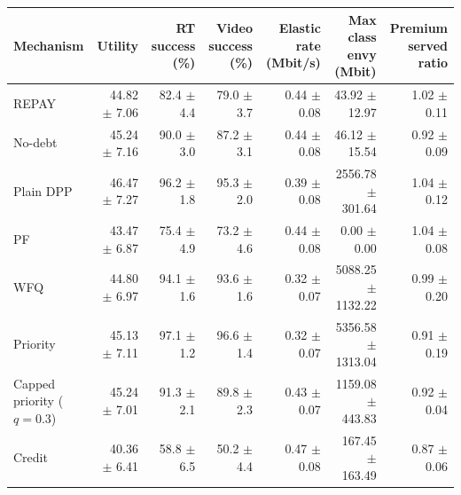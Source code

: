 \begin{tabular}{lrrrrrr}
\toprule
Mechanism & Utility & RT success (\%) & Video success (\%) & Elastic rate (Mbit/s) & Max class envy (Mbit) & Premium served ratio \\
\midrule
REPAY & 44.82 $\pm$ 7.06 & 82.4 $\pm$ 4.4 & 79.0 $\pm$ 3.7 & 0.44 $\pm$ 0.08 & 43.92 $\pm$ 12.97 & 1.02 $\pm$ 0.11 \\
No-debt & 45.24 $\pm$ 7.16 & 90.0 $\pm$ 3.0 & 87.2 $\pm$ 3.1 & 0.44 $\pm$ 0.08 & 46.12 $\pm$ 15.54 & 0.92 $\pm$ 0.09 \\
Plain DPP & 46.47 $\pm$ 7.27 & 96.2 $\pm$ 1.8 & 95.3 $\pm$ 2.0 & 0.39 $\pm$ 0.08 & 2556.78 $\pm$ 301.64 & 1.04 $\pm$ 0.12 \\
PF & 43.47 $\pm$ 6.87 & 75.4 $\pm$ 4.9 & 73.2 $\pm$ 4.6 & 0.44 $\pm$ 0.08 & 0.00 $\pm$ 0.00 & 1.04 $\pm$ 0.08 \\
WFQ & 44.80 $\pm$ 6.97 & 94.1 $\pm$ 1.6 & 93.6 $\pm$ 1.6 & 0.32 $\pm$ 0.07 & 5088.25 $\pm$ 1132.22 & 0.99 $\pm$ 0.20 \\
Priority & 45.13 $\pm$ 7.11 & 97.1 $\pm$ 1.2 & 96.6 $\pm$ 1.4 & 0.32 $\pm$ 0.07 & 5356.58 $\pm$ 1313.04 & 0.91 $\pm$ 0.19 \\
Capped priority ($q=0.3$) & 45.24 $\pm$ 7.01 & 91.3 $\pm$ 2.1 & 89.8 $\pm$ 2.3 & 0.43 $\pm$ 0.07 & 1159.08 $\pm$ 443.83 & 0.92 $\pm$ 0.04 \\
Credit & 40.36 $\pm$ 6.41 & 58.8 $\pm$ 6.5 & 50.2 $\pm$ 4.4 & 0.47 $\pm$ 0.08 & 167.45 $\pm$ 163.49 & 0.87 $\pm$ 0.06 \\
\bottomrule
\end{tabular}
